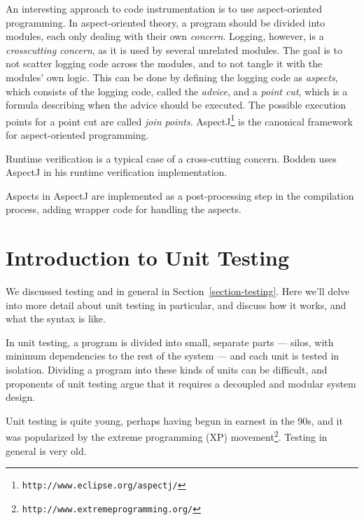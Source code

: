 \documentclass[a4paper,11pt]{kth-mag}
\begin{document}
An interesting approach to code instrumentation is to use aspect-oriented
programming. In aspect-oriented theory, a program should be divided into
modules, each only dealing with their own \textit{concern}. Logging, however,
is a \textit{crosscutting concern}, as it is used by several unrelated modules.
The goal is to not scatter logging code across the modules, and to not tangle
it with the modules' own logic. This can be done by defining the logging code
as \textit{aspects}, which consists of the logging code, called the
\textit{advice}, and a \textit{point cut}, which is a formula describing when
the advice should be executed. The possible execution points for a point cut
are called \textit{join points}.
AspectJ\footnote{\texttt{http://www.eclipse.org/aspectj/}} is the canonical
framework for aspect-oriented programming.

Runtime verification is a typical case of a cross-cutting concern. Bodden
\cite{bodden05efficientrv} uses AspectJ in his runtime verification
implementation.

Aspects in AspectJ are implemented as a post-processing step in the compilation
process, adding wrapper code for handling the aspects.






\pagestyle{newchap}
\chapter{Introduction to Unit Testing} \label{chapter-intro-to-unit-testing}

We discussed testing and in general in Section~\ref{section-testing}. Here
we'll delve into more detail about unit testing in particular, and discuss how
it works, and what the syntax is like.

In unit testing, a program is divided into small, separate parts --- silos,
with minimum dependencies to the rest of the system --- and each unit is tested
in isolation. Dividing a program into these kinds of units can be difficult,
and proponents of unit testing argue that it requires a decoupled and modular
system design.

Unit testing is quite young, perhaps having begun in earnest in the 90s, and it
was popularized by the extreme programming (XP)
movement\footnote{\texttt{http://www.extremeprogramming.org/}}. Testing in
general is very old.
\end{document}
